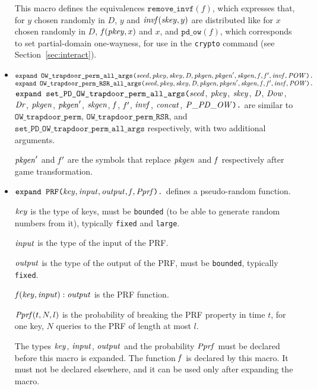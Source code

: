 \documentclass{article}
\begin{document}
\begin{itemize}
   This macro defines the equivalences $\texttt{remove\_invf}(f)$,
   which expresses that, for $y$ chosen randomly in $D$, $y$ and
   $\mathit{invf}(\mathit{skey}, y)$ are distributed like for $x$ chosen
   randomly in $D$, $\mathit{f}(\mathit{pkey}, x)$ and $x$, and
   $\texttt{pd\_ow}(f)$, which corresponds to set partial-domain one-wayness, for use in the
   \texttt{crypto} command (see Section~\ref{sec:interact}).

\item $\texttt{expand OW\_trapdoor\_perm\_all\_args(}\mathit{seed}, \mathit{pkey}, \mathit{skey}, \mathit{D}, \mathit{pkgen}, \mathit{pkgen}', \mathit{skgen}, \mathit{f}, \mathit{f}', \mathit{invf}, \mathit{POW}\texttt{).}$\\
$\texttt{expand OW\_trapdoor\_perm\_RSR\_all\_args(}\mathit{seed}, \mathit{pkey}, \mathit{skey}, \mathit{D}, \mathit{pkgen}, \mathit{pkgen}', \mathit{skgen}, \mathit{f}, \mathit{f}', \mathit{invf}, \mathit{POW}\texttt{).}$\\
$\texttt{expand set\_PD\_OW\_trapdoor\_perm\_all\_args(}\mathit{seed}$, $\mathit{pkey}$, $\mathit{skey}$, $\mathit{D}$, $\mathit{Dow}$, $\mathit{Dr}$, $\mathit{pkgen}$, $\mathit{pkgen}'$, $\mathit{skgen}$, $\mathit{f}$, $\mathit{f}'$, $\mathit{invf}$, $\mathit{concat}$, $\mathit{P\_PD\_OW}\texttt{).}$ are similar to $\texttt{OW\_trapdoor\_perm}$, $\texttt{OW\_trapdoor\_perm\_RSR}$, and
$\texttt{set\_PD\_OW\_trapdoor\_perm\_all\_args}$ respectively, with two additional arguments.

$\mathit{pkgen}'$ and $\mathit{f}'$ are the symbols that replace $\mathit{pkgen}$ and $\mathit{f}$ respectively after game transformation.

\item $\texttt{expand PRF(}\mathit{key}, \mathit{input}, \mathit{output}, \mathit{f}, \mathit{Pprf}\texttt{).}$ 
defines a pseudo-random function.

   $\mathit{key}$ is the type of keys, must be \texttt{bounded} (to be able to generate random numbers from it), typically \texttt{fixed} and \texttt{large}.

   $\mathit{input}$ is the type of the input of the PRF.

   $\mathit{output}$ is the type of the output of the PRF, must be \texttt{bounded}, typically \texttt{fixed}.

   $\mathit{f}(\mathit{key}, \mathit{input}):\mathit{output}$ is the PRF function.

   $\mathit{Pprf}(t, N, l)$ is the probability of breaking the PRF property
   in time $t$, for one key, $N$ queries to the PRF of length at most $l$.

   The types $\mathit{key}$, $\mathit{input}$, $\mathit{output}$
   and the probability $\mathit{Pprf}$ must be declared before this macro
   is expanded. The function $\mathit{f}$ is declared by
   this macro. It must not be declared elsewhere, and it can be
   used only after expanding the macro.


\end{itemize}
\end{document}
